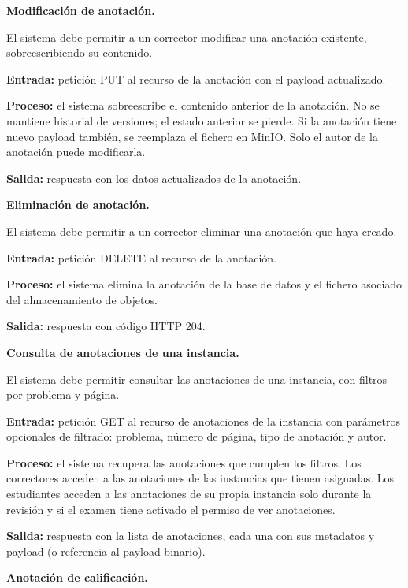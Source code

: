 \begin{functional}
\begin{functional}
    \item \textbf{Modificación de anotación.}

    El sistema debe permitir a un corrector modificar una anotación existente, sobreescribiendo su contenido.

    \textbf{Entrada:} petición PUT al recurso de la anotación con el payload actualizado.

    \textbf{Proceso:} el sistema sobreescribe el contenido anterior de la anotación. No se mantiene historial de versiones; el estado anterior se pierde. Si la anotación tiene nuevo payload también, se reemplaza el fichero en MinIO. Solo el autor de la anotación puede modificarla.

    \textbf{Salida:} respuesta con los datos actualizados de la anotación.

    \item \textbf{Eliminación de anotación.}

    El sistema debe permitir a un corrector eliminar una anotación que haya creado.

    \textbf{Entrada:} petición DELETE al recurso de la anotación.

    \textbf{Proceso:} el sistema elimina la anotación de la base de datos y el fichero asociado del almacenamiento de objetos.

    \textbf{Salida:} respuesta con código HTTP 204.

    \item \textbf{Consulta de anotaciones de una instancia.}

    El sistema debe permitir consultar las anotaciones de una instancia, con filtros por problema y página.

    \textbf{Entrada:} petición GET al recurso de anotaciones de la instancia con parámetros opcionales de filtrado: problema, número de página, tipo de anotación y autor.

    \textbf{Proceso:} el sistema recupera las anotaciones que cumplen los filtros. Los correctores acceden a las anotaciones de las instancias que tienen asignadas. Los estudiantes acceden a las anotaciones de su propia instancia solo durante la revisión y si el examen tiene activado el permiso de ver anotaciones.

    \textbf{Salida:} respuesta con la lista de anotaciones, cada una con sus metadatos y payload (o referencia al payload binario).

    \item \textbf{Anotación de calificación.}


\end{functional}
\end{functional}
